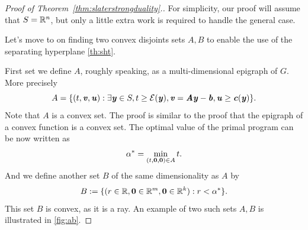 {%












\begin{proof}[Proof of Theorem~\ref{thm:slaterstrongduality}.]
  For simplicity, our proof will assume that $S = \mathbb{R}^n$, but only a little
  extra work is required to handle the general case.

  Let's move to on finding two convex disjoints sets $A, B$ to enable the use of the separating hyperplane \autoref{th:sht}.

First set we define $A$, roughly speaking, as a multi-dimensional epigraph of
$G$. More precisely
\begin{equation*} A = \{(t, \boldsymbol{\mathit{v}}, \boldsymbol{\mathit{u}}) : \exists \boldsymbol{\mathit{y}} \in S, t \geq \mathcal{E}(\boldsymbol{\mathit{y}}), \boldsymbol{\mathit{v}} = \boldsymbol{\mathit{A}}\boldsymbol{\mathit{y}} - \boldsymbol{\mathit{b}}, \boldsymbol{\mathit{u}} \geq \boldsymbol{\mathit{c}}(\boldsymbol{\mathit{y}})\}. \end{equation*}
Note that $A$ is a convex set. The proof is similar to the proof that the epigraph of a convex function is a convex set.
The optimal value of the primal program can be now written as
\begin{equation*} \alpha^* = \min_{(t,\boldsymbol{0},\boldsymbol{0}) \in A} t. \end{equation*}
And we define another set $B$ of the same dimensionality as $A$ by
\begin{equation*} B := \{(r \in \mathbb{R}, \boldsymbol{0} \in \mathbb{R}^m, \boldsymbol{0} \in \mathbb{R}^k) : r < \alpha^* \}. \end{equation*}
This set $B$ is convex, as it is a ray.
An example of two such sets $A,B$ is illustrated in \autoref{fig:ab}.


\end{proof}}
